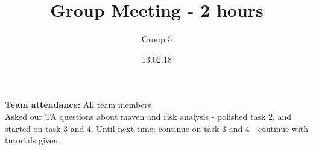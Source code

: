 \documentclass{article}
\title{Group Meeting - 2 hours}
\author{Group 5}
\date{13.02.18}
\begin{document}
	\maketitle
	\noindent
	\textbf{Team attendance:} All team members \\
	
	\noindent
	Asked our TA questions about maven and risk analysis - polished task 2,
	and started on task 3 and 4. Until next time: continue on task 3 and 4
	- continue with tutorials given.
\end{document}
